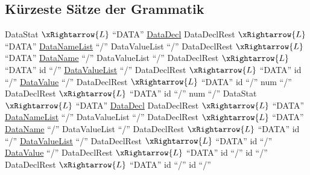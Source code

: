\documentclass[11pt, a4paper, twoside]{article}   	%
\begin{document}
\subsection{Kürzeste Sätze der Grammatik}
DataStat $\xRightarrow{L}$ \enquote{DATA} \underline{DataDecl} DataDeclRest
\newline
\null\hspace{1.55cm} $\xRightarrow{L}$ \enquote{DATA} \underline{DataNameList} \enquote{/} DataValueList \enquote{/} DataDeclRest
\newline
\null\hspace{1.55cm} $\xRightarrow{L}$ \enquote{DATA} \underline{DataName} \enquote{/} DataValueList \enquote{/} DataDeclRest
\newline
\null\hspace{1.55cm} $\xRightarrow{L}$ \enquote{DATA} id \enquote{/} \underline{DataValueList} \enquote{/} DataDeclRest
\newline
\null\hspace{1.55cm} $\xRightarrow{L}$ \enquote{DATA} id \enquote{/} \underline{DataValue} \enquote{/} DataDeclRest
\newline
\null\hspace{1.55cm} $\xRightarrow{L}$ \enquote{DATA} id \enquote{/} num  \enquote{/} DataDeclRest
\newline
\null\hspace{1.55cm} $\xRightarrow{L}$ \enquote{DATA} id \enquote{/} num  \enquote{/}
\newline
\newline
\newline
%
DataStat $\xRightarrow{L}$ \enquote{DATA} \underline{DataDecl} DataDeclRest
\newline
\null\hspace{1.55cm} $\xRightarrow{L}$ \enquote{DATA} \underline{DataNameList} \enquote{/} DataValueList \enquote{/} DataDeclRest
\newline
\null\hspace{1.55cm} $\xRightarrow{L}$ \enquote{DATA} \underline{DataName} \enquote{/} DataValueList \enquote{/} DataDeclRest
\newline
\null\hspace{1.55cm} $\xRightarrow{L}$ \enquote{DATA} id \enquote{/} \underline{DataValueList} \enquote{/} DataDeclRest
\newline
\null\hspace{1.55cm} $\xRightarrow{L}$ \enquote{DATA} id \enquote{/} \underline{DataValue} \enquote{/} DataDeclRest
\newline
\null\hspace{1.55cm} $\xRightarrow{L}$ \enquote{DATA} id \enquote{/} id  \enquote{/} DataDeclRest
\newline
\null\hspace{1.55cm} $\xRightarrow{L}$ \enquote{DATA} id \enquote{/} id  \enquote{/}
\newpage
\end{document}
